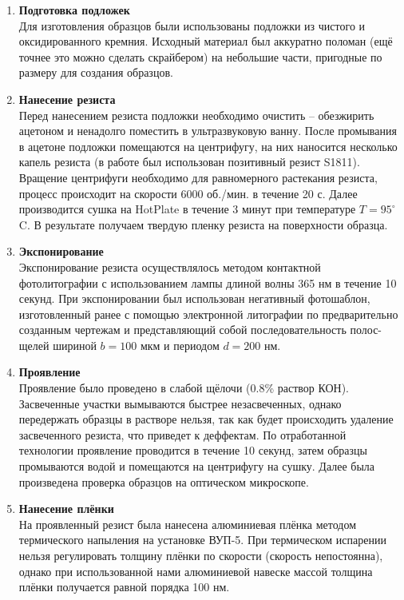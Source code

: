\documentclass[a4paper,12pt]{article}
\begin{document}
\begin{enumerate}
    \item \textbf{Подготовка подложек} \\
    Для изготовления образцов были использованы подложки из чистого и оксидированного кремния. Исходный материал был аккуратно поломан (ещё точнее это можно сделать скрайбером) на небольшие части, пригодные по размеру для создания образцов.

    \item \textbf{Нанесение резиста} \\
    Перед нанесением резиста подложки необходимо очистить – обезжирить ацетоном и ненадолго поместить в ультразвуковую ванну. После промывания в ацетоне подложки помещаются на центрифугу, на них наносится несколько капель резиста (в работе был использован позитивный резист S1811). Вращение центрифуги необходимо для равномерного растекания резиста, процесс происходит на скорости 6000 об./мин. в течение 20 с. Далее производится сушка на HotPlate в течение 3 минут при температуре $T = 95^\circ$C. В результате получаем твердую пленку резиста на поверхности образца.

    \item \textbf{Экспонирование} \\
    Экспонирование резиста осуществлялось методом контактной фотолитографии с использованием лампы длиной волны 365 нм в течение 10 секунд. При экспонировании был использован негативный фотошаблон, изготовленный ранее с помощью электронной литографии по предварительно созданным чертежам и представляющий собой последовательность полос-щелей шириной $b = 100$ мкм и периодом $d = 200$ нм.

    \item \textbf{Проявление} \\
    Проявление было проведено в слабой щёлочи (0.8\% раствор КОН). Засвеченные участки вымываются быстрее незасвеченных, однако передержать образцы в растворе нельзя, так как будет происходить удаление засвеченного резиста, что приведет к деффектам. По отработанной технологии проявление проводится в течение 10 секунд, затем образцы промываются водой и помещаются на центрифугу на сушку. Далее была произведена проверка образцов на оптическом микроскопе.

    \item \textbf{Нанесение плёнки} \\
    На проявленный резист была нанесена алюминиевая плёнка методом термического напыления на установке ВУП-5. При термическом испарении нельзя регулировать толщину плёнки по скорости (скорость непостоянна), однако при использованной нами алюминиевой навеске массой  толщина плёнки получается равной порядка 100 нм.


\end{enumerate}
\end{document}
